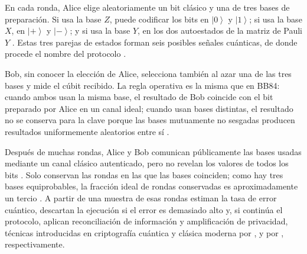 En cada ronda, Alice elige aleatoriamente un bit clásico y una de tres bases de preparación. Si usa la base $Z$, puede codificar los bits en $\left|0\right\rangle$ y $\left|1\right\rangle$; si usa la base $X$, en $\left|+\right\rangle$ y $\left|-\right\rangle$; y si usa la base $Y$, en los dos autoestados de la matriz de Pauli $Y$ \citep{pauli1927,bruss1998}. Estas tres parejas de estados forman seis posibles señales cuánticas, de donde procede el nombre del protocolo \citep{bruss1998}.

Bob, sin conocer la elección de Alice, selecciona también al azar una de las tres bases y mide el cúbit recibido. La regla operativa es la misma que en BB84: cuando ambos usan la misma base, el resultado de Bob coincide con el bit preparado por Alice en un canal ideal; cuando usan bases distintas, el resultado no se conserva para la clave porque las bases mutuamente no sesgadas producen resultados uniformemente aleatorios entre sí \citep{schwinger1960,bennett1984}.

Después de muchas rondas, Alice y Bob comunican públicamente las bases usadas mediante un canal clásico autenticado, pero no revelan los valores de todos los bits \citep{bennett1984}. Solo conservan las rondas en las que las bases coinciden; como hay tres bases equiprobables, la fracción ideal de rondas conservadas es aproximadamente un tercio \citep{bruss1998}. A partir de una muestra de esas rondas estiman la tasa de error cuántico, descartan la ejecución si el error es demasiado alto y, si continúa el protocolo, aplican reconciliación de información y amplificación de privacidad, técnicas introducidas en criptografía cuántica y clásica moderna por \cite{brassard1994}, y por \cite{bennett1995}, respectivamente.


